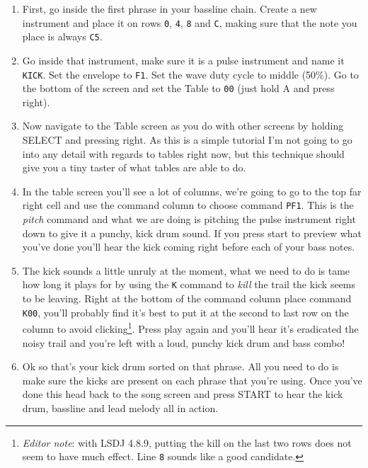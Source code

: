 \documentclass[]{article}
\newcommand{\buttonStyle}[1]{\textsf{#1}\xspace}
\newcommand{\bA}{\buttonStyle{A}}
\newcommand{\bStart}{\buttonStyle{{START}}}
\newcommand{\bSelect}{\buttonStyle{{SELECT}}}
\newcommand{\bRight}{\buttonStyle{right}}
\newcommand{\gbtxt}[1]{\texttt{#1}\xspace}
\begin{document}
\begin{enumerate}

\item First, go inside the first phrase in your bassline chain. Create a new instrument and place it on rows \gbtxt{0}, \gbtxt{4}, \gbtxt{8} and \gbtxt{C}, making sure that the note you place is always \gbtxt{C5}.

\item Go inside that instrument, make sure it is a pulse instrument and name it \gbtxt{KICK}. Set the envelope to \gbtxt{F1}. Set the wave duty cycle to middle (50\%). Go to the bottom of the screen and set the Table to \gbtxt{00} (just hold \bA and press \bRight).

\item Now navigate to the Table screen as you do with other screens by holding \bSelect and pressing \bRight. As this is a simple tutorial I'm not going to go into any detail with regards to tables right now, but this technique should give you a tiny taster of what tables are able to do.

\item In the table screen you'll see a lot of columns, we're going to go to the top far right cell and use the command column to choose command \gbtxt{PF1}. This is the \textit{pitch} command and what we are doing is pitching the pulse instrument right down to give it a punchy, kick drum sound. If you press start to preview what you've done you'll hear the kick coming right before each of your bass notes.

\item The kick sounds a little unruly at the moment, what we need to do is tame how long it plays for by using the \gbtxt{K} command to \textit{kill} the trail the kick seems to be leaving. Right at the bottom of the command column place command \gbtxt{K00}, you'll probably find it's best to put it at the second to last row on the column to avoid clicking\footnote{\textit{Editor note}: with LSDJ 4.8.9, putting the kill on the last two rows does not seem to have much effect. Line \gbtxt{8} sounds like a good candidate.}. Press play again and you'll hear it's eradicated the noisy trail and you're left with a loud, punchy kick drum and bass combo!

\item Ok so that's your kick drum sorted on that phrase. All you need to do is make sure the kicks are present on each phrase that you're using. Once you've done this head back to the song screen and press \bStart to hear the kick drum, bassline and lead melody all in action.

\end{enumerate}
\end{document}
